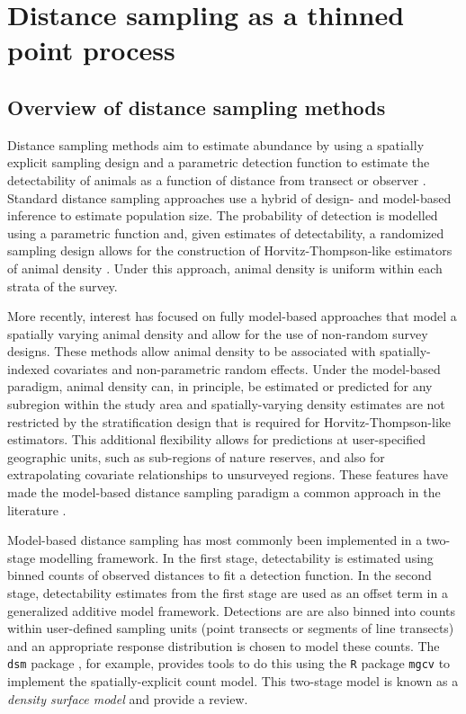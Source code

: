 \documentclass{statsoc}
\begin{document}
\section{Distance sampling as a thinned point process}
\label{sec-ds-pp}

\subsection{Overview of distance sampling methods}

Distance sampling methods aim to estimate abundance by using a spatially explicit sampling design and a parametric detection function to estimate the detectability of animals as a function of distance from transect or observer \citep{buckland_distance_2015}.  Standard distance sampling approaches use a hybrid of design- and model-based inference to estimate population size.  The probability of detection is modelled using a parametric function and, given estimates of detectability, a randomized sampling design allows for the construction of Horvitz-Thompson-like estimators of animal density \citep{ buckland_advanced_2004, horvitz_generalization_1952}.  Under this approach, animal density is uniform within each strata of the survey.  

More recently, interest has focused on fully model-based approaches that model a spatially varying animal density and allow for the use of non-random survey designs.  These methods allow animal density to be associated with spatially-indexed covariates and non-parametric random effects.  Under the model-based paradigm, animal density can, in principle, be estimated or predicted for any subregion within the study area \citep{buckland_model-based_2016, miller_spatial_2013, johnson_model-based_2010} and spatially-varying density estimates are not restricted by the stratification design that is required for Horvitz-Thompson-like estimators.  This additional flexibility allows for predictions at user-specified geographic units, such as sub-regions of nature reserves, and also for extrapolating covariate relationships to unsurveyed regions.  These features have made the model-based distance sampling paradigm a common approach in the literature \citep{garciabaron_modelling_2019, herr_aerial_2019, breen_new_2017, williams_chilean_2011, stokes_monitoring_2010, williams_modeling_2006}.

Model-based distance sampling has most commonly been implemented in a two-stage modelling framework.  In the first stage, detectability is estimated using binned counts of observed distances to fit a detection function.  In the second stage, detectability estimates from the first stage are used as an offset term in a generalized additive model framework.  Detections are are also binned into counts within user-defined sampling units (point transects or segments of line transects) and an appropriate response distribution is chosen to model these counts.  The \texttt{dsm} package \citep{miller_spatial_2013}, for example, provides tools to do this using the \texttt{R} package \texttt{mgcv} \citep{wood_gam_2017} to implement the spatially-explicit count model.  This two-stage model is known as a \textit{density surface model} and \cite{miller_spatial_2013} provide a review.
\end{document}
